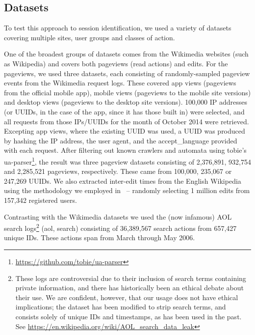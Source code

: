 \subsection{Datasets}
To test this approach to session identification, we used a variety of datasets covering multiple sites, user groups and classes of action.

 One of the broadest groups of datasets comes from the Wikimedia websites (such as Wikipedia) and covers both pageviews (read actions) and edits. For the pageviews, we used three datasets, each consisting of randomly-sampled pageview events from the Wikimedia request logs. These covered app views (pageviews from the official mobile app), mobile views (pageviews to the mobile site versions) and desktop views (pageviews to the desktop site versions). 100,000 IP addresses (or UUIDs, in the case of the app, since it has those built in) were selected, and all requests from those IPs/UUIDs for the month of October 2014 were retrieved. Excepting app views, where the existing UUID was used, a UUID was produced by hashing the IP address, the user agent, and the accept\_language provided with each request. After filtering out known crawlers and automata using tobie's ua-parser\footnote{\url{https://github.com/tobie/ua-parser}}, the result was three pageview datasets consisting of 2,376,891, 932,754 and 2,285,521 pageviews, respectively. These came from 100,000, 235,067 or 247,269 UUIDs. We also extracted inter-edit times from the English Wikipedia using the methodology we employed in~\cite{geiger2013using} -- randomly selecting 1 million edits from 157,342 registered users.

 Contrasting with the Wikimedia datasets we used the (now infamous) AOL search logs\footnote{These logs are controversial due to their inclusion of search terms containing private information, and there has historically been an ethical debate about their use. We are confident, however, that our usage does not have ethical implications; the dataset has been modified to strip search terms, and consists solely of unique IDs and timestamps, as has been used in the past.\cite{mehrzadi2012onextracting}  See \url{https://en.wikipedia.org/wiki/AOL_search_data_leak}} (aol, search) consisting of 36,389,567 search actions from 657,427 unique IDs. These actions span from March through May 2006.

